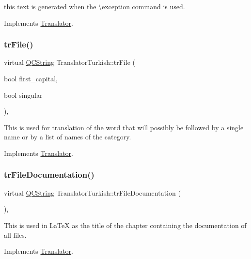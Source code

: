 this text is generated when the \textbackslash{}exception command is used. 

Implements \mbox{\hyperlink{class_translator}{Translator}}.

\mbox{\label{class_translator_turkish_a9009d70836bc23668843c247c19f58ab}} 
\subsubsection{\texorpdfstring{trFile()}{trFile()}}
{\footnotesize\ttfamily virtual \mbox{\hyperlink{class_q_c_string}{Q\+C\+String}} Translator\+Turkish\+::tr\+File (\begin{DoxyParamCaption}\item[{bool}]{first\+\_\+capital,  }\item[{bool}]{singular }\end{DoxyParamCaption})\hspace{0.3cm}{\ttfamily [inline]}, {\ttfamily [virtual]}}

This is used for translation of the word that will possibly be followed by a single name or by a list of names of the category. 

Implements \mbox{\hyperlink{class_translator}{Translator}}.

\mbox{\label{class_translator_turkish_ac29733a455ca3663af7bc9dd71eaba47}} 
\subsubsection{\texorpdfstring{trFileDocumentation()}{trFileDocumentation()}}
{\footnotesize\ttfamily virtual \mbox{\hyperlink{class_q_c_string}{Q\+C\+String}} Translator\+Turkish\+::tr\+File\+Documentation (\begin{DoxyParamCaption}{ }\end{DoxyParamCaption})\hspace{0.3cm}{\ttfamily [inline]}, {\ttfamily [virtual]}}

This is used in La\+TeX as the title of the chapter containing the documentation of all files. 

Implements \mbox{\hyperlink{class_translator}{Translator}}.

